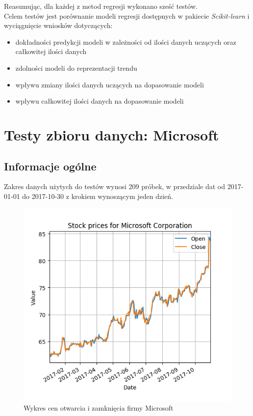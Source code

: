 Reasumując, dla każdej z metod regresji wykonano sześć testów.\\

Celem testów jest porównanie modeli regresji dostępnych w pakiecie \textit{Scikit-learn} i wyciągnięcie wniosków dotyczących:
\begin{itemize}
 \item dokładności predykcji modeli w zależności od ilości danych uczących oraz całkowitej ilości danych
 \item zdolności modeli do reprezentacji trendu
 \item wpływu zmiany ilości danych uczących na dopasowanie modeli
 \item wpływu całkowitej ilości danych na dopasowanie modeli
\end{itemize}



\section{Testy zbioru danych: Microsoft}

\subsection{Informacje ogólne}
Zakres danych użytych do testów wynosi 209 próbek, w przedziale dat od 2017-01-01 do 2017-10-30 z krokiem wynoszącym jeden dzień.\\

\begin{figure}[h!]
\centering
\includegraphics[width=150mm]{pictures/plots/microsoft_oc_price.png}
\caption{Wykres cen otwarcia i zamknięcia firmy Microsoft}
\label{fig:microsoft_oc_price}
\end{figure}

